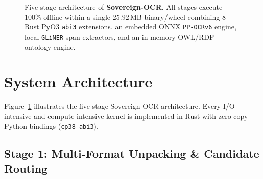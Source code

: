 \documentclass[10pt,twocolumn,letterpaper]{article}
\begin{document}
\begin{figure}[t]
\vspace{-0.4em}
\caption{Five-stage architecture of \textbf{Sovereign-OCR}. All stages execute 100\% offline within a single $25.92\,\text{MB}$ binary/wheel combining 8 Rust PyO3 \texttt{abi3} extensions, an embedded ONNX \texttt{PP-OCRv6} engine, local \texttt{GLiNER} span extractors, and an in-memory OWL/RDF ontology engine.}
\label{fig:pipeline}
\vspace{-0.6em}
\end{figure}

\section{System Architecture}

Figure~\ref{fig:pipeline} illustrates the five-stage Sovereign-OCR architecture. Every I/O-intensive and compute-intensive kernel is implemented in Rust with zero-copy Python bindings (\texttt{cp38-abi3}).

\subsection{Stage 1: Multi-Format Unpacking \& Candidate Routing}
\end{document}
